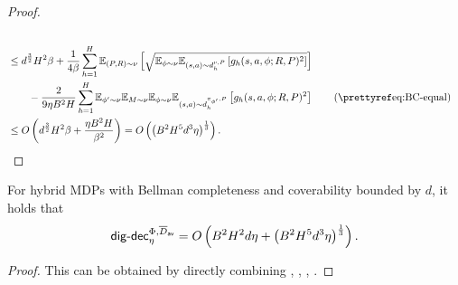 \begin{proof}
\begin{align*}
    \\&\le d^{\frac{3}{2}}H^2\beta + \frac{1}{4\beta}\sum_{h=1}^H\E_{(P,R) \sim \nu}\left[\sqrt{\E_{\phi\sim \nu} \E_{(s,a)\sim d_h^{\nu, P}} \left[ g_h(s,a, \phi; R,P)^2\right] } \right] 
    \\&\qquad - \frac{2}{9\eta B^2 H}\sum_{h=1}^H\E_{\phi' \sim \nu}\E_{M \sim \nu}\E_{\phi \sim \nu}\E_{(s,a)\sim d_h^{\pi_{\phi'}, P}} \left[ g_h(s,a, \phi; R,P)^2\right] \tag{\pref{eq:BC-equal}}
    \\&\le \order\left(d^{\frac{3}{2}}H^2\beta + \frac{\eta B^2 H}{\beta^2}\right) = \order\left(\left(B^2 H^5 d^3 \eta\right)^{\frac{1}{3}}\right).   
\end{align*}
\end{proof}

\begin{lemma}\label{lem: digdec_adv < d hsq}
  For hybrid MDPs with Bellman completeness and coverability bounded by $d$, it holds that 
  \begin{align*}
      \mathsf{dig}\text{-}\mathsf{dec}_\eta^{\Phi,\overline{D}_{\mathsf{av}}}  = O\left( B^2H^2d\eta + \left( B^2H^5d^3 \eta \right)^{\frac{1}{3}} \right). 
  \end{align*}
\end{lemma}
\begin{proof}
   This can be obtained by directly combining , , , .
\end{proof}







